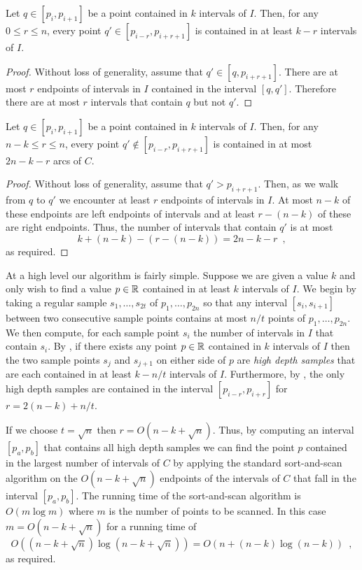 \documentclass[charterfonts,lotsofwhite]{patmorin}
\begin{document}
\begin{lem}
Let $q\in[p_i,p_{i+1}]$ be a point contained in $k$ intervals of $I$.
Then, for any $0\le r\le n$, every point $q'\in[p_{i-r},p_{i+r+1}]$ is
contained in at least $k-r$ intervals of $I$.
\end{lem}

\begin{proof}
Without loss of generality, assume that $q'\in[q,p_{i+r+1}]$.  There are
at most $r$ endpoints of intervals in $I$ contained in the interval
$[q,q']$.  Therefore there are at most $r$ intervals that contain $q$
but not $q'$.
\end{proof}

\begin{lem}
Let $q\in[p_i,p_{i+1}]$ be a point contained in $k$ intervals of $I$.
Then, for any $n-k \le r\le n$, every point $q'\notin[p_{i-r},p_{i+r+1}]$ 
is contained in at most $2n-k-r$ arcs of $C$.
\end{lem}

\begin{proof}
Without loss of generality, assume that $q'> p_{i+r+1}$.  Then, as we
walk from $q$ to $q'$ we encounter at least $r$ endpoints of intervals
in $I$.  At most $n-k$ of these endpoints are left endpoints of
intervals and at least $r-(n-k)$ of these are right endpoints.  Thus,
the number of intervals that contain $q'$ is at most
\[
      k + (n-k) - (r-(n-k)) = 2n - k - r \enspace ,
\]
as required.
\end{proof}

At a high level our algorithm is fairly simple.  Suppose we are given
a value $k$ and only wish to find a value $p\in\mathbb{R}$
contained in at least $k$ intervals of $I$.
We begin by taking a regular sample $s_1,\ldots,s_{2t}$ of
$p_1,\ldots,p_{2n}$ so that any interval $[s_i,s_{i+1}]$ between two
consecutive sample points contains at most $n/t$ points of
$p_1,\ldots,p_{2n}$.  We then compute, for each sample point $s_i$ the
number of intervals in $I$ that contain $s_i$.  By , if
there exists any point $p\in \mathbb{R}$ contained in $k$ intervals of $I$
then the two sample points $s_j$ and $s_{j+1}$ on either side of $p$
are \emph{high depth samples} that are each contained in at least
$k-n/t$ intervals of $I$.  Furthermore, by , the only high
depth samples are contained in the interval $[p_{i-r},p_{i+r}]$ for
$r=2(n-k)+n/t$.  

If we choose $t=\sqrt{n}$ then $r=O(n-k+\sqrt{n})$.  Thus, by
computing an interval $[p_a,p_b]$ that contains all high depth samples
we can find the point $p$ contained in the largest number of
intervals of $C$ by applying the standard sort-and-scan algorithm
on the $O(n-k+\sqrt{n})$ endpoints of the intervals of $C$ that fall
in the interval $[p_a,p_b]$.  The running time of the
sort-and-scan algorithm is $O(m\log m)$ where $m$ is the number of
points to be scanned.  In this case $m=O(n-k+\sqrt{n})$ for a running
time of 
\[
   O((n-k+\sqrt{n})\log(n-k+\sqrt n)) = O(n + (n-k)\log (n-k)) \enspace ,
\]
as required.
\end{document}
